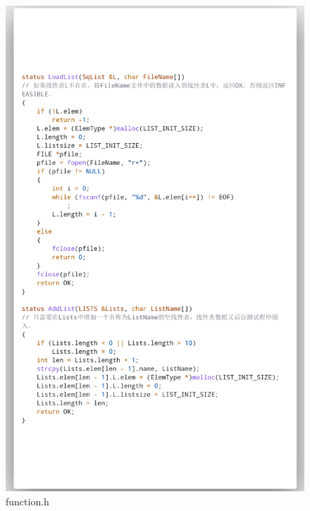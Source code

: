 \documentclass[supercite]{Experimental_Report}
\theoremstyle{definition}
\begin{document}
\begin{figure}[htb]
	\begin{center}
		\includegraphics[scale=0.30]{images/3-7.png}
		\caption{function.h}
		\label{fig3-7}
	\end{center}
\end{figure}
\end{document}
